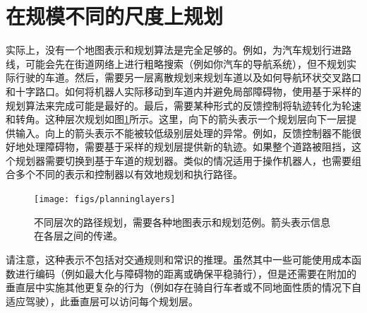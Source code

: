 \section{在规模不同的尺度上规划}
实际上，没有一个地图表示和规划算法是完全足够的。例如，为汽车规划行进路线，可能会先在街道网络上进行粗略搜索（例如你汽车的导航系统），但不规划实际行驶的车道。然后，需要另一层离散规划来规划车道以及如何导航环状交叉路口和十字路口。如何将机器人实际移动到车道内并避免局部障碍物，使用基于采样的规划算法来完成可能是最好的。最后，需要某种形式的反馈控制将轨迹转化为轮速和转角。这种层次规划如图\ref{fig:planninglayers}所示。这里，向下的箭头表示一个规划层向下一层提供输入。向上的箭头表示不能被较低级别层处理的异常。例如，反馈控制器不能很好地处理障碍物，需要基于采样的规划层提供新的轨迹。如果整个道路被阻挡，这个规划器需要切换到基于车道的规划器。类似的情况适用于操作机器人，也需要组合多个不同的表示和控制器以有效地规划和执行路径。

\begin{figure}
\centering
\texttt{[image: figs/planninglayers]}
\caption{不同层次的路径规划，需要各种地图表示和规划范例。箭头表示信息在各层之间的传递。
\label{fig:planninglayers}}
\end{figure}


请注意，这种表示不包括对交通规则和常识的推理。虽然其中一些可能使用成本函数进行编码（例如最大化与障碍物的距离或确保平稳骑行），但是还需要在附加的垂直层中实施其他更复杂的行为（例如存在骑自行车者或不同地面性质的情况下自适应驾驶），此垂直层可以访问每个规划层。


